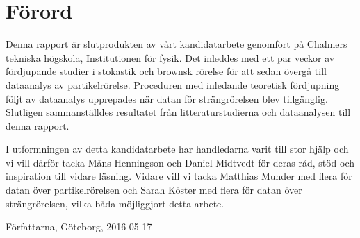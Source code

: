 \chapter*{Förord}

Denna rapport är slutprodukten av vårt kandidatarbete genomfört på Chalmers tekniska högskola, Institutionen för fysik. Det inleddes med ett par veckor av fördjupande studier i stokastik och brownsk rörelse för att sedan övergå till dataanalys av partikelrörelse. Proceduren med inledande teoretisk fördjupning följt av dataanalys upprepades när datan för strängrörelsen blev tillgänglig. Slutligen sammanställdes resultatet från litteraturstudierna och dataanalysen till denna rapport.

I utformningen av detta kandidatarbete har handledarna varit till stor hjälp och vi vill därför tacka Måns Henningson och Daniel Midtvedt för deras råd, stöd och inspiration till vidare läsning. Vidare vill vi tacka Matthias Munder med flera för datan över partikelrörelsen och Sarah Köster med flera för datan över strängrörelsen, vilka båda möjliggjort detta arbete.

\vspace{.5cm}

\begin{flushright}
Författarna, Göteborg, 2016-05-17
\end{flushright}

